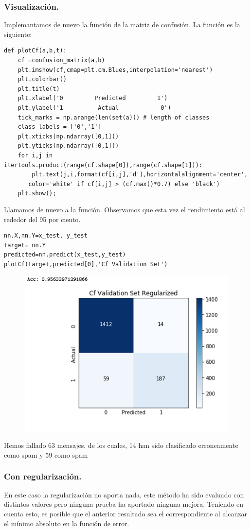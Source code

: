 \documentclass[a4paper,10pt]{article}
\begin{document}
\subsubsection{Visualización.}
Implemantamos de nuevo la función de la matriz de confusión. La función es la siguiente:
\begin{lstlisting}
def plotCf(a,b,t):
    cf =confusion_matrix(a,b)
    plt.imshow(cf,cmap=plt.cm.Blues,interpolation='nearest')
    plt.colorbar()
    plt.title(t)
    plt.xlabel('0         Predicted         1')
    plt.ylabel('1          Actual            0')
    tick_marks = np.arange(len(set(a))) # length of classes
    class_labels = ['0','1']
    plt.xticks(np.ndarray([0,1]))
    plt.yticks(np.ndarray([0,1]))
    for i,j in itertools.product(range(cf.shape[0]),range(cf.shape[1])):
        plt.text(j,i,format(cf[i,j],'d'),horizontalalignment='center',    
	   color='white' if cf[i,j] > (cf.max()*0.7) else 'black')
    plt.show();
\end{lstlisting}
Llamamos de nuevo a la función. Observamos que esta vez el rendimiento está al rededor del 95 por ciento.
\begin{lstlisting}
nn.X,nn.Y=x_test, y_test 
target= nn.Y
predicted=nn.predict(x_test,y_test) 
plotCf(target,predicted[0],'Cf Validation Set')
\end{lstlisting}
\begin{figure}[H]
\centering
\includegraphics[width=12.0cm, height=8.5cm]{Annotation 2020-03-23 161410}
\end{figure}
Hemos fallado 63 mensajes, de los cuales, 14 han sido clasificado erroneamente como spam y 59 como spam
\subsubsection{Con regularización.}
En este caso la regularización no aporta nada, este método ha sido evaluado con distintos valores pero ninguna prueba ha aportado ninguna mejora. Teniendo en cuenta esto, es posible que el anterior resultado sea el correspondiente al alcanzar el mínimo absoluto en la función de error.
\end{document}
